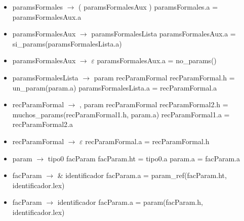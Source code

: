 \documentclass[11pt]{article}
\begin{document}
        \begin{itemize}
            \item paramsFormales $\rightarrow$ ( paramsFormalesAux )
                \subitem paramsFormales.a = paramsFormalesAux.a
            \item paramsFormalesAux $\rightarrow$ paramsFormalesLista
                \subitem paramsFormalesAux.a = si\_params(paramsFormalesLista.a)
            \item paramsFormalesAux $\rightarrow$ $\varepsilon$
                \subitem paramsFormalesAux.a = no\_params()
            \item paramsFormalesLista $\rightarrow$ param recParamFormal
                \subitem recParamFormal.h = un\_param(param.a)
                \subitem paramsFormalesLista.a = recParamFormal.a
            \item recParamFormal $\rightarrow$ , param recParamFormal
                \subitem recParamFormal2.h = muchos\_params(recParamFormal1.h, param.a)
                \subitem recParamFormal1.a = recParamFormal2.a
            \item recParamFormal $\rightarrow$ $\varepsilon$
                \subitem recParamFormal.a = recParamFormal.h
            \item param $\rightarrow$ tipo0 facParam
                \subitem facParam.ht = tipo0.a
                \subitem param.a = facParam.a
            \item facParam $\rightarrow$ \& identificador
                \subitem facParam.a = param\_ref(facParam.ht, identificador.lex)
            \item facParam $\rightarrow$ identificador
                \subitem facParam.a = param(facParam.h, identificador.lex)
        \end{itemize}
        \
\end{document}
